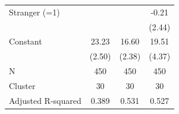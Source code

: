 {\begin{tabular}{l*{3}{c}}
Stranger (=1)       &                     &                     &       -0.21         \\
                    &                     &                     &      (2.44)         \\
Constant            &       23.23\sym{***}&       16.60\sym{***}&       19.51\sym{***}\\
                    &      (2.50)         &      (2.38)         &      (4.37)         \\
\midrule
N                   &         450         &         450         &         450         \\
Cluster             &          30         &          30         &          30         \\
Adjusted R-squared  &       0.389         &       0.531         &       0.527         \\
\bottomrule
\end{tabular}
}
